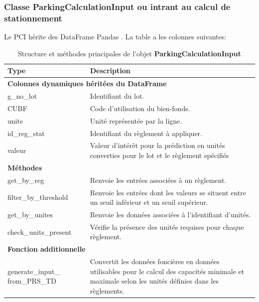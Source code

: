         \subsubsection{Classe ParkingCalculationInput ou intrant au calcul de stationnement}
            Le \ac{PCI} hérite des DataFrame Pandas \parencite{pandas_contributors_pandas_2025}. La table a les colonnes suivantes:
            {\captionsetup{justification=centering}
            \setlength{\LTcapwidth}{\linewidth} 
            \begin{table}[H]
            \centering
            \caption{Structure et méthodes principales de l'objet \textbf{ParkingCalculationInput}}
            \label{tab:regulationinput_structure}
            \begin{tabular}{p{5cm}p{11cm}}
            \toprule
            \textbf{Type} & \textbf{Description} \\
            \midrule
            \multicolumn{2}{l}{\textbf{Colonnes dynamiques héritées du DataFrame}} \\
            \midrule
            g\_no\_lot & Identifiant du lot. \\
            \ac{CUBF} & Code d'utilisation du bien-fonds. \\
            unite & Unité représentée par la ligne. \\
            id\_reg\_stat & Identifiant du règlement à appliquer. \\
            valeur & Valeur d'intérêt pour la prédiction en unités converties pour le lot et le règlement spécifiés \\
            \midrule
            \multicolumn{2}{l}{\textbf{Méthodes}} \\
            \midrule
            get\_by\_reg & Renvoie les entrées associées à un règlement. \\
            filter\_by\_threshold & Renvoie les entrées dont les valeurs se situent entre un seuil inférieur et un seuil supérieur. \\
            get\_by\_unites & Renvoie les données associées à l'identifiant d'unités. \\
            check\_units\_present & Vérifie la présence des unités requises pour chaque règlement. \\
            \midrule
            \multicolumn{2}{l}{\textbf{Fonction additionnelle}} \\
            \midrule
            generate\_input\_ from\_PRS\_TD & Convertit les données foncières en données utilisables pour le calcul des capacités minimale et maximale selon les unités définies dans les règlements. \\
            \bottomrule
            \end{tabular}
            \end{table}}
        \clearpage
        
